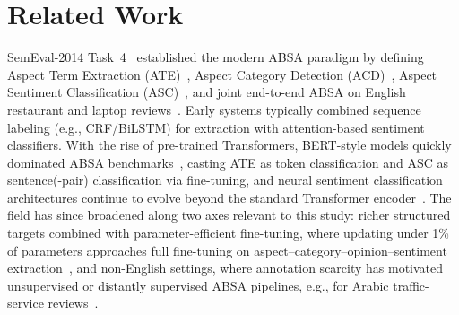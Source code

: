 \documentclass[bdcc,article,submit,moreauthors]{Definitions/mdpi}
\begin{document}

\section{Related Work}
\label{sec:related_work}

SemEval-2014 Task~4~\cite{pontiki-etal-2014-semeval} established the modern ABSA paradigm by defining Aspect Term Extraction (ATE)~\cite{ma-etal-2019-exploring}, Aspect Category Detection (ACD)~\cite{hu-etal-2021-multi-label}, Aspect Sentiment Classification (ASC)~\cite{10.1145/3721844}, and joint end-to-end ABSA on English restaurant and laptop reviews~\cite{Hua2024}. Early systems typically combined sequence labeling (e.g., CRF/BiLSTM) for extraction with attention-based sentiment classifiers. With the rise of pre-trained Transformers, BERT-style models quickly dominated ABSA benchmarks~\cite{ZohrehMadhoushi2019,electronics12030515}, casting ATE as token classification and ASC as sentence(-pair) classification via fine-tuning, and neural sentiment classification architectures continue to evolve beyond the standard Transformer encoder~\cite{bdcc10050161}. The field has since broadened along two axes relevant to this study: richer structured targets combined with parameter-efficient fine-tuning, where updating under 1\% of parameters approaches full fine-tuning on aspect--category--opinion--sentiment extraction~\cite{electronics14040690}, and non-English settings, where annotation scarcity has motivated unsupervised or distantly supervised ABSA pipelines, e.g., for Arabic traffic-service reviews~\cite{smartcities8020062}.
\end{document}
